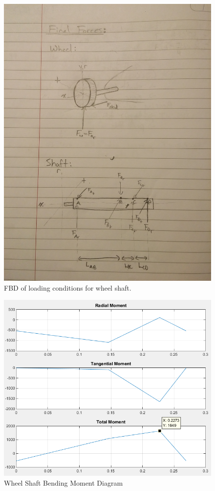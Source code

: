 \begin{figure}[H]
	\centering
	\includegraphics[width=\textwidth,angle=-90]{dom/loading_conditions_calc.jpg}
	\caption{FBD of loading conditions for wheel shaft.}
	\label{fig:fbd_wheelshaft}
\end{figure}

\begin{figure}[H]
\centering
\includegraphics[width=\textwidth]{images/wheelshaft_bmd}
\caption{Wheel Shaft Bending Moment Diagram}
\label{fig:wheel_shaft_bmd}
\end{figure}

